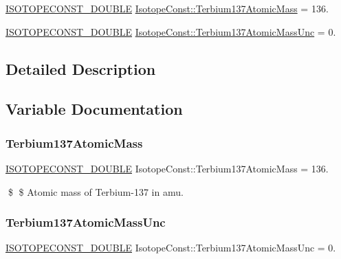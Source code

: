 \begin{DoxyCompactItemize}
\item 
\mbox{\hyperlink{group___isotope_const-_macros_ga8f45a7272ce02c0b4c65c44636ed719a}{I\+S\+O\+T\+O\+P\+E\+C\+O\+N\+S\+T\+\_\+\+D\+O\+U\+B\+LE}} \mbox{\hyperlink{group___isotope_const-_terbium-_tb137_ga1bf89a7dc877d4107e45e968bee2094b}{Isotope\+Const\+::\+Terbium137\+Atomic\+Mass}} = 136.
\item 
\mbox{\hyperlink{group___isotope_const-_macros_ga8f45a7272ce02c0b4c65c44636ed719a}{I\+S\+O\+T\+O\+P\+E\+C\+O\+N\+S\+T\+\_\+\+D\+O\+U\+B\+LE}} \mbox{\hyperlink{group___isotope_const-_terbium-_tb137_ga46a3658f623202ccdb2700ef4f23985a}{Isotope\+Const\+::\+Terbium137\+Atomic\+Mass\+Unc}} = 0.
\end{DoxyCompactItemize}


\subsection{Detailed Description}


\subsection{Variable Documentation}
\mbox{\label{group___isotope_const-_terbium-_tb137_ga1bf89a7dc877d4107e45e968bee2094b}} 
\subsubsection{\texorpdfstring{Terbium137\+Atomic\+Mass}{Terbium137AtomicMass}}
{\footnotesize\ttfamily \mbox{\hyperlink{group___isotope_const-_macros_ga8f45a7272ce02c0b4c65c44636ed719a}{I\+S\+O\+T\+O\+P\+E\+C\+O\+N\+S\+T\+\_\+\+D\+O\+U\+B\+LE}} Isotope\+Const\+::\+Terbium137\+Atomic\+Mass = 136.}

\$ \$ Atomic mass of Terbium-\/137 in amu. \mbox{\label{group___isotope_const-_terbium-_tb137_ga46a3658f623202ccdb2700ef4f23985a}} 
\subsubsection{\texorpdfstring{Terbium137\+Atomic\+Mass\+Unc}{Terbium137AtomicMassUnc}}
{\footnotesize\ttfamily \mbox{\hyperlink{group___isotope_const-_macros_ga8f45a7272ce02c0b4c65c44636ed719a}{I\+S\+O\+T\+O\+P\+E\+C\+O\+N\+S\+T\+\_\+\+D\+O\+U\+B\+LE}} Isotope\+Const\+::\+Terbium137\+Atomic\+Mass\+Unc = 0.}

